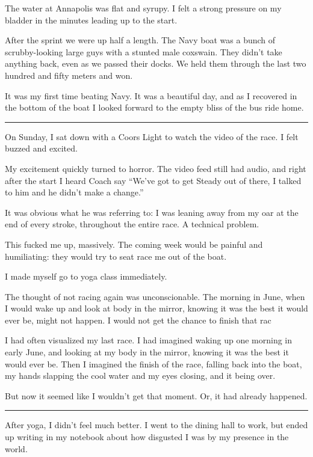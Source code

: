 The water at Annapolis was flat and syrupy.  I felt a strong pressure on my
bladder in the minutes leading up to the start.   

After the sprint we were up half a length.  The Navy boat was a bunch of
scrubby-looking large guys with a stunted male coxswain.  They didn't take
anything back, even as we passed their docks.  We held them through the last two
hundred and fifty meters and won.  

It was my first time beating Navy.  It was a beautiful day, and as I recovered
in the bottom of the boat I looked forward to the empty bliss of the bus ride
home.

\plainfancybreak{12pt}{2}{}

On Sunday, I sat down with a Coors Light to watch the video of the race.  I felt
buzzed and excited. 

My excitement quickly turned to horror.  The video feed still had audio, and
right after the start I heard Coach say ``We've got to get Steady out of there,
I talked to him and he didn't make a change.''  

It was obvious what he was referring to: I was leaning away from my oar at the
end of every stroke, throughout the entire race.  A technical problem.

This fucked me up, massively.  The coming week would be painful and humiliating:
they would try to seat race me out of the boat.

I made myself go to yoga class immediately.  


The thought of not racing again was unconscionable.  The morning in June, when I
would wake up and look at body in the mirror, knowing it was the best it would
ever be, might not happen.  I would not get the chance to finish that rac

I had often visualized my last race.  I had imagined waking up one morning in
early June, and looking at my body in the mirror, knowing it was the best it
would ever be.  Then I imagined the finish of the race, falling back into the
boat, my hands slapping the cool water and my eyes closing, and it being over.

But now it seemed like I wouldn't get that moment.  Or, it had already happened.

\plainfancybreak{12pt}{2}{}

After yoga, I didn't feel much better.  I went to the dining hall to work, but
ended up writing in my notebook about how disgusted I was by my presence in the
world.

